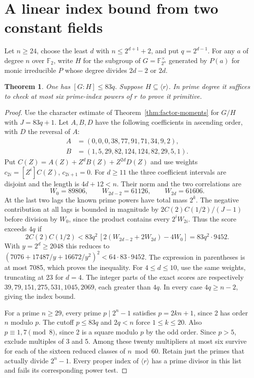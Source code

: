 \documentclass[11pt]{article}
\newtheorem{theorem}{Theorem}
\newcommand{\F}{\mathbb F_2}
\begin{document}
\clearpage
\section{A linear index bound from two constant fields}
\label{sec:linear-field-index}
Let \(n\ge24\), choose the least \(d\) with \(n\le2^{d+1}+2\), and
put \(q=2^{d-1}\). For any \(a\) of degree \(n\) over \(\F\), write
\(H\) for the subgroup of \(G=\mathbb F_{2^n}^\times\) generated by
\(P(a)\) for monic irreducible \(P\) whose degree divides \(2d-2\) or \(2d\).

\begin{theorem}\label{thm:linear-field-index}
One has \([G:H]\le83q\). Suppose \(H\subseteq\langle r\rangle\).
In prime degree it suffices to check at most six prime-index powers
of \(r\) to prove it primitive.
\end{theorem}
\begin{proof}
Use the character estimate of Theorem~\ref{thm:factor-moments} for \(G/H\)
with \(J=83q+1\). Let \(A,B,D\) have the following coefficients in
ascending order, with \(D\) the reversal of \(A\):
\[
\begin{aligned}
 A&=(0,0,0,38,77,91,71,34,9,2),\\
 B&=(1,5,29,82,124,124,82,29,5,1).
\end{aligned}
\]
Put \(C(Z)=A(Z)+Z^dB(Z)+Z^{2d}D(Z)\) and use weights
\(c_{2i}=[Z^i]C(Z)\), \(c_{2i+1}=0\). For \(d\ge11\) the three
coefficient intervals are disjoint and the length is \(4d+12<n\).
Their norm and the two correlations are
\[
 W_0=89806,\qquad W_{2d-2}=61126,\qquad W_{2d}=61606 .
\]
At the last two lags the known prime powers have total mass \(2^k\).
The negative contribution at all lags is bounded in magnitude by
\(2C(2)C(1/2)/(J-1)\) before division by \(W_0\), since the product
contains every \(2^iW_{2i}\). Thus the score exceeds \(4q\) if
\[
 2C(2)C(1/2)<83q^2\,[2(W_{2d-2}+2W_{2d})-4W_0]=83q^2\cdot9452 .
\]
With \(y=2^d\ge2048\) this reduces to
\((7076+17487/y+16672/y^2)^2<64\cdot83\cdot9452\).
The expression in parentheses is at most 7085, which proves the inequality.
For \(4\le d\le10\), use the same weights, truncating at 23 for \(d=4\).
The integer parts of the exact scores are respectively
\(39,79,151,275,531,1045,2069\), each greater than \(4q\).
In every case \(4q\ge n-2\), giving the index bound.

For a prime \(n\ge29\), every prime \(p\mid 2^n-1\) satisfies
\(p=2kn+1\), since 2 has order \(n\) modulo \(p\).
The cutoff \(p\le83q\) and \(2q<n\) force \(1\le k\le20\).
Also \(p\equiv1,7\pmod8\), since 2 is a square modulo \(p\) by the
odd order. Since \(p>5\), exclude multiples of 3 and 5. Among these
twenty multipliers at most six survive for each of the sixteen reduced
classes of \(n\bmod60\). Retain just the primes that actually divide
\(2^n-1\). Every proper index of \(\langle r\rangle\) has a prime
divisor in this list and fails its corresponding power test.
\end{proof}
\end{document}
